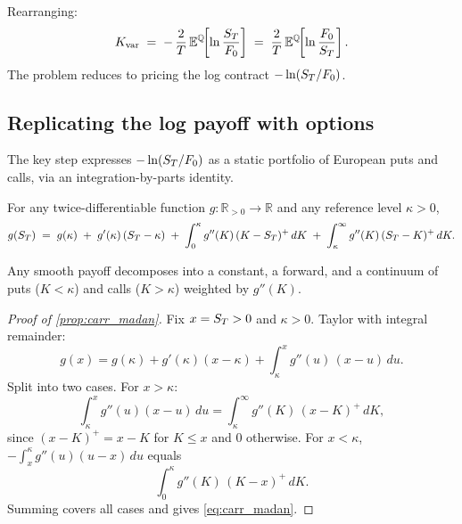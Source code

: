 \noindent
Rearranging:
\begin{equation}
  K_{\text{var}}
  \;=\;
  -\,\frac{2}{T}\,
  \mathbb{E}^{\mathbb{Q}}\!\!\left[\ln\frac{S_T}{F_0}\right]
  \;=\;
  \frac{2}{T}\,
  \mathbb{E}^{\mathbb{Q}}\!\!\left[\ln\frac{F_0}{S_T}\right].
  \label{eq:kvar_from_log}
\end{equation}
The problem reduces to pricing the log contract
$-\ln(S_T / F_0)$.

\subsection{Replicating the log payoff with options}
\label{subsec:log_replication}

The key step expresses $-\ln(S_T/F_0)$ as a static portfolio
of European puts and calls, via an integration-by-parts identity.

\begin{proposition}
\label{prop:carr_madan}
For any twice-differentiable function $g:\mathbb{R}_{>0}\to\mathbb{R}$
and any reference level $\kappa > 0$,
\begin{equation}
  g(S_T)
  \;=\;
  g(\kappa)
  \;+\;
  g'(\kappa)\,(S_T - \kappa)
  \;+\;
  \int_0^{\kappa} g''(K)\,(K - S_T)^+\,dK
  \;+\;
  \int_{\kappa}^{\infty} g''(K)\,(S_T - K)^+\,dK.
  \label{eq:carr_madan}
\end{equation}
\end{proposition}

Any smooth payoff decomposes into a constant, a forward, and a
continuum of puts ($K<\kappa$) and calls ($K>\kappa$) weighted by
$g''(K)$.

\begin{proof}[Proof of \cref{prop:carr_madan}]
Fix $x=S_T>0$ and $\kappa>0$. Taylor with integral remainder:
\[
  g(x) = g(\kappa) + g'(\kappa)(x - \kappa)
  + \int_\kappa^x g''(u)\,(x - u)\,du.
\]
Split into two cases. For $x>\kappa$:
\[
  \int_\kappa^x g''(u)(x - u)\,du
  = \int_\kappa^\infty g''(K)\,(x - K)^+\,dK,
\]
since $(x-K)^+=x-K$ for $K\leq x$ and 0 otherwise. For $x<\kappa$,
$-\int_x^\kappa g''(u)(u-x)\,du$ equals
\[
  \int_0^\kappa g''(K)\,(K - x)^+\,dK.
\]
Summing covers all cases and gives \cref{eq:carr_madan}.
\end{proof}


